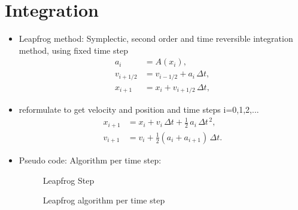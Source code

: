 \documentclass[11pt,
               a4paper,
               bibtotoc,
               idxtotoc,
               headsepline,
               footsepline,
               footexclude,
               BCOR12mm,
               DIV13,
               openany,   %
               ]
               {scrbook}
\begin{document}
\chapter{Integration}
    \begin{itemize}
        \item Leapfrog method: Symplectic, second order and time reversible integration method, using fixed time step
        \begin{equation}
            \begin{array}{ll}
                a_i &= A(x_i), \\
                v_{i+1/2} &= v_{i-1/2} + a_{i}\, \Delta t, \\
                x_{i+1} &= x_{i} + v_{i+1/2}\, \Delta t,
            \end{array}
        \end{equation}
        \item reformulate to get velocity and position and time steps i=0,1,2,...
        \begin{equation}
            \begin{array}{ll}
                x_{i+1} &= x_i + v_i\, \Delta t + \tfrac{1}{2}\,a_i\, \Delta t^{\,2}, \\
                v_{i+1} &= v_i + \tfrac{1}{2}(a_i + a_{i+1})\,\Delta t.
            \end{array}
        \end{equation}
        \item Pseudo code: Algorithm per time step:
        \begin{figure}
            \begin{algorithm}[H]
            \caption[Leapfrog Step]{Leapfrog Step}
            \end{algorithm}
            \caption{Leapfrog algorithm per time step}
        \end{figure}
    \end{itemize}
\end{document}
